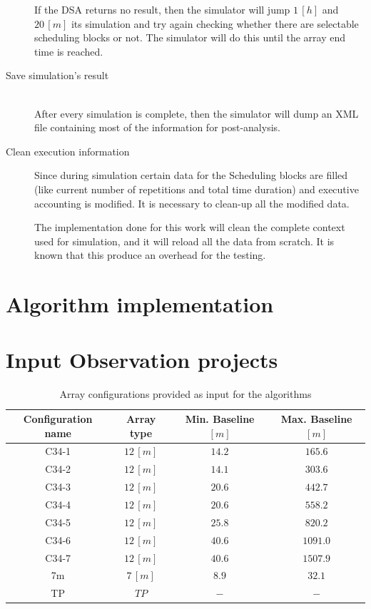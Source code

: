 \begin{description}
If the DSA returns no result, then the simulator will jump $1\,[h]$ and $20\,[m]$ its simulation and try again checking whether there are selectable scheduling blocks or not. The simulator will do this until the array end time is reached.

\item[Save simulation's result] \hfill \\
After every simulation is complete, then the simulator will dump an XML file containing most of the information for post-analysis.

\item[Clean execution information]
Since during simulation certain data for the Scheduling blocks are filled (like current number of repetitions and total time duration) and executive accounting is modified. It is necessary to clean-up all the modified data. 

The implementation done for this work will clean the complete context used for simulation, and it will reload all the data from scratch. It is known that this produce an overhead for the testing.

\end{description}

\section {Algorithm implementation}

\section {Input Observation projects}

\begin{table}
\begin{center}
\begin{tabular}{|c|c|c|c|}
\hline
Configuration name & Array type & Min. Baseline $[m]$ & Max. Baseline $[m]$\\
\hline
C34-1 & $12\,[m]$ & $14.2$ & $165.6$ \\
\hline
C34-2 & $12\,[m]$ & $14.1$ & $303.6$ \\
\hline
C34-3 & $12\,[m]$ & $20.6$ & $442.7$ \\
\hline
C34-4 & $12\,[m]$ & $20.6$ & $558.2$ \\
\hline
C34-5 & $12\,[m]$ & $25.8$ & $820.2$ \\
\hline
C34-6 & $12\,[m]$ & $40.6$ & $1091.0$ \\
\hline
C34-7 & $12\,[m]$ & $40.6$ & $1507.9$ \\
\hline
7m    & $7\,[m]$  & $8.9$  & $32.1$ \\
\hline
TP    & $TP$      & $-$    & $-$ \\
\hline
\end{tabular}
\end{center}
\caption{Array configurations provided as input for the algorithms}
\label{table:input-array-configs}
\end{table}

